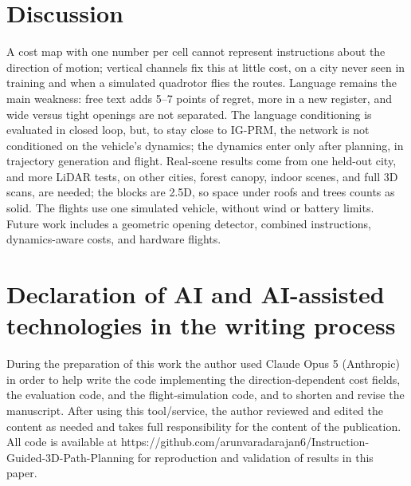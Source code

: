 \documentclass[conference]{IEEEtran}
\begin{document}
\section{Discussion}
A cost map with one number per cell cannot represent instructions about the direction of motion; vertical channels fix this at little cost, on a city never seen in training and when a simulated quadrotor flies the routes. Language remains the main weakness: free text adds 5--7 points of regret, more in a new register, and wide versus tight openings are not separated. The language conditioning is evaluated in closed loop, but, to stay close to IG-PRM, the network is not conditioned on the vehicle's dynamics; the dynamics enter only after planning, in trajectory generation and flight. Real-scene results come from one held-out city, and more LiDAR tests, on other cities, forest canopy, indoor scenes, and full 3D scans, are needed; the blocks are 2.5D, so space under roofs and trees counts as solid. The flights use one simulated vehicle, without wind or battery limits. Future work includes a geometric opening detector, combined instructions, dynamics-aware costs, and hardware flights.

\section*{Declaration of AI and AI-assisted technologies in the writing process}
During the preparation of this work the author used Claude Opus 5 (Anthropic) in order to help write the code implementing the direction-dependent cost fields, the evaluation code, and the flight-simulation code, and to shorten and revise the manuscript. After using this tool/service, the author reviewed and edited the content as needed and takes full responsibility for the content of the publication. All code is available at https://github.com/arunvaradarajan6/Instruction-Guided-3D-Path-Planning for reproduction and validation of results in this paper.
\end{document}
